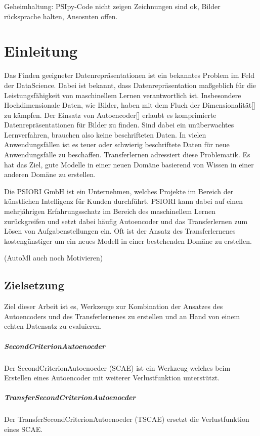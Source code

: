 \listoftodos

Geheimhaltung: PSIpy-Code nicht zeigen Zeichnungen sind ok, Bilder rücksprache halten, Ansosnten offen.
  
\chapter{Einleitung}
\label{chap:Einleitung}
	Das Finden geeigneter Datenrepräsentationen ist ein bekanntes Problem im Feld der DataScience. Dabei ist bekannt, dass Datenrepräsentation maßgeblich für die Leistungsfähigkeit von maschinellem Lernen verantwortlich ist. Insbesondere Hochdimensionale Daten, wie Bilder, haben mit dem Fluch der Dimensionalität[] zu kämpfen. Der Einsatz von Autoencoder[] erlaubt es komprimierte Datenrepräsentationen für Bilder zu finden. Sind dabei ein unüberwachtes Lernverfahren, brauchen also keine beschrifteten Daten.
	In vielen Anwendungsfällen ist es teuer oder schwierig beschriftete Daten für neue Anwendungsfälle zu beschaffen. Transferlernen adressiert diese Problematik. Es hat das Ziel, gute Modelle in einer neuen Domäne basierend von Wissen in einer anderen Domäne zu erstellen.
	
	Die PSIORI GmbH \cite{PSIORIGmbH.2020} ist ein Unternehmen, welches Projekte im Bereich der künstlichen Intelligenz für Kunden durchführt. PSIORI kann dabei auf einen mehrjährigen Erfahrungsschatz im Bereich des maschinellem Lernen zurückgreifen und setzt dabei häufig Autoencoder und das Transferlernen zum Lösen von Aufgabenstellungen ein. Oft ist der Ansatz des Transferlernenes kostengünstiger um ein neues Modell in einer bestehenden Domäne zu erstellen. 

 	(AutoMl auch noch Motivieren)

	\section{Zielsetzung}
	\label{sec:Zielsetzung}
	Ziel dieser Arbeit ist es, Werkzeuge zur Kombination der Ansatzes des Autoencoders und des Transferlernenes zu erstellen und an Hand von einem echten Datensatz zu evaluieren.
	\paragraph{SecondCriterionAutoenocder} Der SecondCriterionAutoenocder (SCAE) ist ein Werkzeug welches beim Erstellen eines Autoencoder mit weiterer Verlustfunktion unterstützt.  
    \paragraph{TransferSecondCriterionAutoenocder} Der TransferSecondCriterionAutoenocder (TSCAE) ersetzt die Verlustfunktion eines SCAE.
